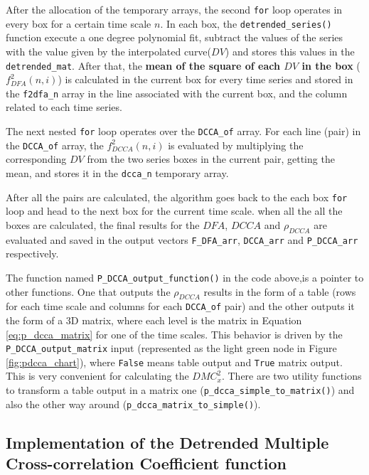 \documentclass[nojss]{jss}
\begin{document}
After the allocation of the temporary arrays, the second \verb"for" loop operates in every box for a certain time scale $n$. In each box, the \verb"detrended_series()" function execute a one degree polynomial fit, subtract the values of the series with the value given by the interpolated curve($DV$) and stores this values in the \verb"detrended_mat". After that, the \textbf{mean of the square of each $DV$ in the box} ($f_{DFA}^{2}(n, i)$) is calculated in the current box for every time series and stored in the \verb"f2dfa_n" array in the line associated with the current box, and the column related to each time series.

The next nested \verb"for" loop operates over the \verb"DCCA_of" array. For each line (pair) in the \verb"DCCA_of" array, the $f_{DCCA}^{2}(n, i)$ is evaluated by multiplying the corresponding $DV$ from the two series  boxes in the current pair, getting the mean, and stores it in the \verb"dcca_n" temporary array.

After all the pairs are calculated, the algorithm goes back to the each box \verb"for" loop and head to the next box for the current time scale. when all the all the boxes are calculated, the final results for the $DFA$, $DCCA$ and $\rho_{DCCA}$ are evaluated and saved in the output vectors \verb"F_DFA_arr", \verb"DCCA_arr" and \verb"P_DCCA_arr" respectively.

The function named \verb"P_DCCA_output_function()" in the code above,is a pointer to other functions. One that outputs the  $\rho_{DCCA}$ results in the form of a table (rows for each time scale and columns for each \verb"DCCA_of" pair) and the other outputs it the form of a 3D matrix, where each level is the matrix in Equation \ref{eq:p_dcca_matrix} for one of the time scales. This behavior is driven by the \verb"P_DCCA_output_matrix" input (represented as the light green node in Figure \ref{fig:pdcca_chart}), where \verb"False" means table output and \verb"True" matrix output. This is very convenient for calculating the $DMC_x^2$. There are two utility functions to transform a table output in a matrix one (\verb"p_dcca_simple_to_matrix()") and also the other way around (\verb"p_dcca_matrix_to_simple()").

\subsection{Implementation of the Detrended Multiple Cross-correlation Coefficient function}
\end{document}
